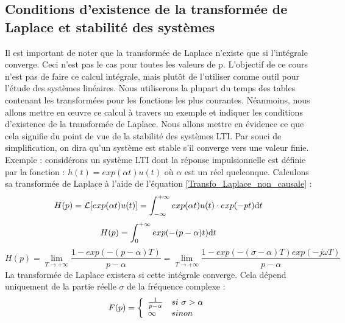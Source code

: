 	
	\subsection{Conditions d'existence de la transformée de Laplace et stabilité des systèmes}
	Il est important de noter que la transformée de Laplace n'existe que si l'intégrale converge. Ceci n'est pas le cas pour toutes les valeurs de p.
	L'objectif de ce cours n'est pas de faire ce calcul intégrale, mais plutôt de l'utiliser comme outil pour l'étude des systèmes linéaires. Nous utiliserons la plupart du temps des tables contenant les transformées pour les fonctions les plus courantes. Néanmoins, nous allons mettre en œuvre ce calcul à travers un exemple et indiquer les conditions d'existence de la transformée de Laplace. Nous allons mettre en évidence ce que cela signifie du point de vue de la stabilité des systèmes LTI. Par souci de simplification, on dira qu'un système est stable s'il converge vers une valeur finie.
	Exemple : considérons un système LTI dont la réponse impulsionnelle est définie par la fonction : $h(t) = exp(\alpha t)u(t) $ où $\alpha$ est un réel quelconque.
	Calculons sa transformée de Laplace à l'aide de l'équation \ref{Transfo_Laplace_non_causale} :
	\begin{equation*}
	H(p) = \mathcal{L}[exp(\alpha t)u(t)] = \int_{-\infty}^{+\infty}exp(\alpha t)u(t) \cdot exp(-pt) \mathrm{d} t
	\end{equation*}
	\begin{equation*}
	H(p) = \int_{0}^{+\infty}exp(-(p-\alpha) t) \mathrm{d} t
	\end{equation*}
	\begin{equation*}
	H(p) = \lim_{T \to +\infty} \frac{1-exp(-(p-\alpha)T)}{p-\alpha} = \lim_{T \to +\infty} \frac{1-exp(-(\sigma-\alpha)T)exp(-j\omega T)}{p-\alpha}
	\end{equation*}
	La transformée de Laplace existera si cette intégrale converge. Cela dépend uniquement de la partie réelle $\sigma$ de la fréquence complexe :
	\begin{equation}\label{}
	F(p) = \left \{
	\begin{array}{l l}
	\frac{1}{p-\alpha}  & si~\sigma>\alpha \\
	\infty   & sinon \\
	\end{array}
	\right .	 	
	\end{equation}
	
